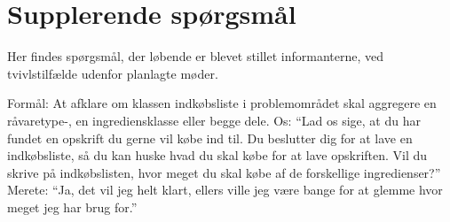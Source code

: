 \section{Supplerende spørgsmål}

Her findes spørgsmål, der løbende er blevet stillet informanterne, ved tvivlstilfælde udenfor planlagte møder.

Formål: At afklare om klassen indkøbsliste i problemområdet skal aggregere en råvaretype-, en ingrediensklasse eller begge dele.
Os: ``Lad os sige, at du har fundet en opskrift du gerne vil købe ind til. Du beslutter dig for at lave en indkøbsliste, så du kan huske hvad du skal købe for at lave opskriften. Vil du skrive på indkøbslisten, hvor meget du skal købe af de forskellige ingredienser?''
Merete: ``Ja, det vil jeg helt klart, ellers ville jeg være bange for at glemme hvor meget jeg har brug for.''